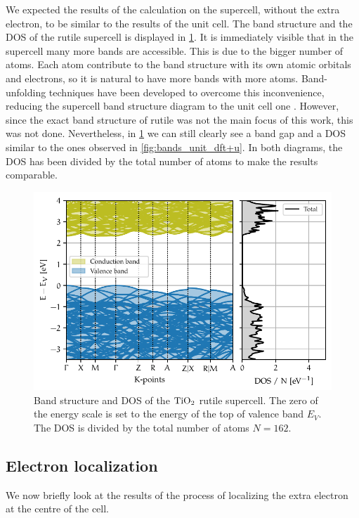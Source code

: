 We expected the results of the calculation on the supercell, without the extra electron, to be similar to the results of the unit cell. The band structure and the DOS of the rutile supercell is displayed in \cref{fig:bands_super}. It is immediately visible that in the supercell many more bands are accessible. This is due to the bigger number of atoms. Each atom contribute to the band structure with its own atomic orbitals and electrons, so it is natural to have more bands with more atoms. Band-unfolding techniques have been developed to overcome this inconvenience, reducing the supercell band structure diagram to the unit cell one \cite{mayo2020}. However, since the exact band structure of rutile was not the main focus of this work, this was not done. Nevertheless, in \cref{fig:bands_super} we can still clearly see a band gap and a DOS similar to the ones observed in \cref{fig:bands_unit_dft+u}. In both diagrams, the DOS has been divided by the total number of atoms to make the results comparable.

\begin{figure}
    \centering
    \includegraphics[width=\textwidth]{figures/super.pdf}
    \caption[Band structure and DOS of the $\ce{TiO_2}$ rutile supercell]{Band structure and DOS of the $\ce{TiO_2}$ rutile supercell. The zero of the energy scale is set to the energy of the top of valence band $E_V$. The DOS is divided by the total number of atoms $N = 162$.}
    \label{fig:bands_super}

\end{figure}

\subsection{Electron localization}
We now briefly look at the results of the process of localizing the extra electron at the centre of the cell.

